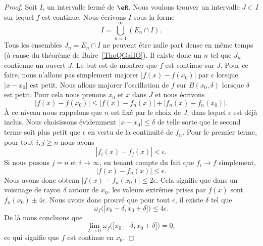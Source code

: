\begin{proof}
    Soit \( I\), un intervalle fermé de \( \eR\). Nous voulons trouver un intervalle \( J\subset I\) sur lequel \( f\) est continue. Nous écrivons \( I\) sous la forme
    \begin{equation}
        I=\bigcup_{n=1}^{\infty}(E_n\cap I).
    \end{equation}
    Tous les ensembles \( J_n=E_n\cap I\) ne peuvent être nulle part dense en même temps (à cause du théorème de Baire~\ref{ThoQGalIO}). Il existe donc un \( n\) tel que \( J_n\) contienne un ouvert \( J\). Le but est de montrer que \( f\) est continue sur \( J\). Pour ce faire, nous n'allons pas simplement majorer \( | f(x)-f(x_0) |\) par \( \epsilon\) lorsque \( | x-x_0 |\) est petit. Nous allons majorer l'oscillation de \( f\) sur \( B(x_0,\delta)\) lorsque \( \delta\) est petit. Pour cela nous prenons \( x_0\) et \( x\) dans \( J\) et nous écrivons
    \begin{equation}
        | f(x)-f(x_0) |\leq | f(x)-f_n(x) |+| f_n(x)-f_n(x_0) |.
    \end{equation}
    À ce niveau nous rappelons que \( n\) est fixé par le choix de \( J\), dans lequel \( \epsilon\) est déjà inclus. Nous choisissons évidemment \( | x-x_0 |\leq \delta\) de telle sorte que le second terme soit plus petit que \( \epsilon\) en vertu de la continuité de \( f_n\). Pour le premier terme, pour tout \( i,j\geq n\) nous avons
    \begin{equation}
        | f_i(x)-f_j(x) |<\epsilon.
    \end{equation}
    Si nous posons \( j=n\) et \( i\to\infty\), en tenant compte du fait que \( f_i\to f\) simplement,
    \begin{equation}
        | f(x)-f_n(x) |\leq \epsilon.
    \end{equation}
    Nous avons donc obtenu \( | f(x)-f_n(x_0) |\leq 2\epsilon\). Cela signifie que dans un voisinage de rayon \( \delta\) autour de \( x_0\), les valeurs extrêmes prises par \( f(x) \) sont \( f_n(x_0)\pm 4\epsilon\). Nous avons donc prouvé que pour tout \( \epsilon\), il existe \( \delta\) tel que
    \begin{equation}
        \omega_f\big( \mathopen[ x_0-\delta , x_0+\delta \mathclose] \big)\leq 4\epsilon.
    \end{equation}
    De là nous concluons que
    \begin{equation}
        \lim_{\delta\to 0}\omega_f\big( \mathopen[ x_0-\delta , x_0+\delta \mathclose] \big)=0,
    \end{equation}
    ce qui signifie que \( f\) est continue en \( x_0\).
\end{proof}

